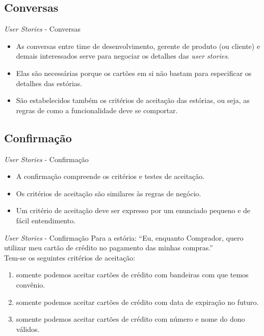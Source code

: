 \documentclass[11pt]{beamer}
\begin{document}
   \subsection{Conversas}

   \begin{frame}{\textit{User Stories} - Conversas}
      \begin{itemize}
         \item As conversas entre time de desenvolvimento, gerente de produto (ou cliente) e demais interessados serve para negociar os detalhes das \textit{user stories}.
         \item Elas são necessárias porque os cartões em si não bastam para especificar os detalhes das estórias.
         \item São estabelecidos também os critérios de aceitação das estórias, ou seja, as regras de como a funcionalidade deve se comportar.
      \end{itemize}
   \end{frame}

   \subsection{Confirmação}

   \begin{frame}{\textit{User Stories} - Confirmação}
      \begin{itemize}
         \item A confirmação compreende os critérios e testes de aceitação.
         \item Os critérios de aceitação são similares às regras de negócio.
         \item Um critério de aceitação deve ser expresso por um enunciado pequeno e de fácil entendimento.
      \end{itemize}
   \end{frame}

   \begin{frame}{\textit{User Stories} - Confirmação}
      Para a estória: ``Eu, enquanto Comprador, quero utilizar meu cartão de crédito no pagamento das minhas compras.''\\
      Tem-se os seguintes critérios de aceitação:
      \begin{enumerate}
         \item somente podemos aceitar cartões de crédito com bandeiras com que temos convênio.
         \item somente podemos aceitar cartões de crédito com data de expiração no futuro.
         \item somente podemos aceitar cartões de crédito com número e nome do dono válidos.
      \end{enumerate}
   \end{frame}
\end{document}
